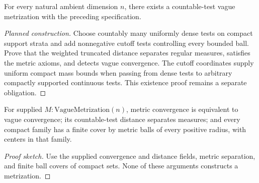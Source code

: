 \begin{lemma}
\label{lem:vague-countable-metric}
For every natural ambient dimension $n$, there exists a countable-test vague metrization with the preceding specification.
\end{lemma}
\begin{proof}[Planned construction]
Choose countably many uniformly dense tests on compact support strata and add nonnegative cutoff tests controlling every bounded ball. Prove that the weighted truncated distance separates regular measures, satisfies the metric axioms, and detects vague convergence. The cutoff coordinates supply uniform compact mass bounds when passing from dense tests to arbitrary compactly supported continuous tests. This existence proof remains a separate obligation.
\end{proof}

\begin{lemma}
\label{lem:vague-metric-properties}
For supplied $M:\mathrm{VagueMetrization}(n)$, metric convergence is equivalent to vague convergence; its countable-test distance separates measures; and every compact family has a finite cover by metric balls of every positive radius, with centers in that family.
\end{lemma}
\begin{proof}[Proof sketch]
Use the supplied convergence and distance fields, metric separation, and finite ball covers of compact sets. None of these arguments constructs a metrization.
\end{proof}


